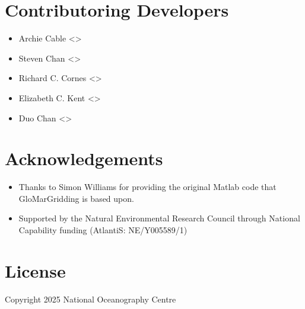 \documentclass[letterpaper,10pt,english]{sphinxmanual}
\begin{document}
\section{Contributoring Developers}
\label{\detokenize{authors:contributoring-developers}}\begin{itemize}
\item {}
\sphinxAtStartPar
Archie Cable \textless{}\textgreater{} 

\item {}
\sphinxAtStartPar
Steven Chan \textless{}\textgreater{} 

\item {}
\sphinxAtStartPar
Richard C. Cornes \textless{}\textgreater{} 

\item {}
\sphinxAtStartPar
Elizabeth C. Kent \textless{}\textgreater{} 

\item {}
\sphinxAtStartPar
Duo Chan \textless{}\textgreater{}

\end{itemize}


\section{Acknowledgements}
\label{\detokenize{authors:acknowledgements}}\begin{itemize}
\item {}
\sphinxAtStartPar
Thanks to Simon Williams for providing the original Matlab code that GloMarGridding is based upon.

\item {}
\sphinxAtStartPar
Supported by the Natural Environmental Research Council through National Capability funding
(AtlantiS: NE/Y005589/1)

\end{itemize}


\section{License}
\label{\detokenize{authors:license}}
\sphinxAtStartPar
Copyright 2025 National Oceanography Centre
\end{document}
